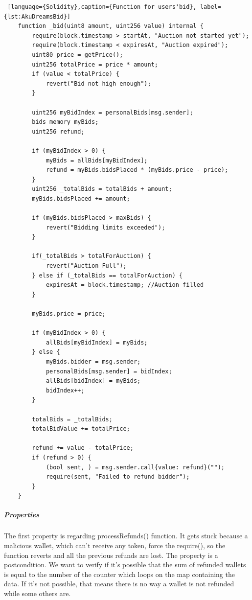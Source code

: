 \begin{lstlisting} [language={Solidity},caption={Function for users'bid}, label={lst:AkuDreamsBid}]
    function _bid(uint8 amount, uint256 value) internal {
        require(block.timestamp > startAt, "Auction not started yet");
        require(block.timestamp < expiresAt, "Auction expired");
        uint80 price = getPrice();
        uint256 totalPrice = price * amount;
        if (value < totalPrice) {
            revert("Bid not high enough");
        }
        
        uint256 myBidIndex = personalBids[msg.sender];
        bids memory myBids;
        uint256 refund;

        if (myBidIndex > 0) {
            myBids = allBids[myBidIndex];
            refund = myBids.bidsPlaced * (myBids.price - price);
        }
        uint256 _totalBids = totalBids + amount;
        myBids.bidsPlaced += amount;

        if (myBids.bidsPlaced > maxBids) {
            revert("Bidding limits exceeded");
        }

        if(_totalBids > totalForAuction) {
            revert("Auction Full");
        } else if (_totalBids == totalForAuction) {
            expiresAt = block.timestamp; //Auction filled
        }

        myBids.price = price;

        if (myBidIndex > 0) {
            allBids[myBidIndex] = myBids;
        } else {
            myBids.bidder = msg.sender;
            personalBids[msg.sender] = bidIndex;
            allBids[bidIndex] = myBids;
            bidIndex++;
        }
        
        totalBids = _totalBids;
        totalBidValue += totalPrice;

        refund += value - totalPrice;
        if (refund > 0) {
            (bool sent, ) = msg.sender.call{value: refund}("");
            require(sent, "Failed to refund bidder");
        }
    }
\end{lstlisting}

\subparagraph{Properties}
The first property is regarding processRefunds() function. It gets stuck because a malicious wallet, which can't receive 
any token, force the require(), so the function reverts and all the previous refunds are lost. The property is a postcondition. 
We want to verify if it's possible that the sum of refunded wallets is equal to the number of the counter which loops on the map containing the data. 
If it's not possible, that means there is no way a wallet is not refunded while some others are.  

